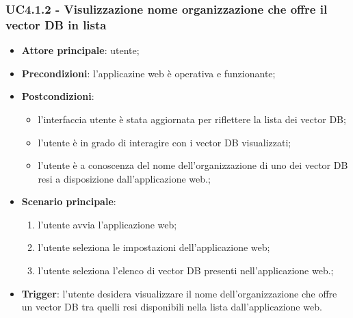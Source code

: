 \documentclass[10pt, a4paper]{article}
\begin{document}
    \subsubsection{UC4.1.2 - Visulizzazione nome organizzazione che offre il vector DB in lista}
    \begin{itemize}
        \item \textbf{Attore principale}: utente;
        \item \textbf{Precondizioni}: l'applicazine web è operativa e funzionante;
        \item \textbf{Postcondizioni}: 
        \begin{itemize}
            \item l'interfaccia utente è stata aggiornata per riflettere la lista dei vector DB;
            \item l'utente è in grado di interagire con i vector DB visualizzati;
            \item l'utente è a conoscenza del nome dell'organizzazione di uno dei vector DB resi a disposizione dall'applicazione web.;
        \end{itemize}
        \item \textbf{Scenario principale}:
            \begin{enumerate}
                \item l'utente avvia l'applicazione web;
                \item l'utente seleziona le impostazioni dell'applicazione web;
                \item l'utente seleziona l'elenco di vector DB presenti nell'applicazione web.;
            \end{enumerate}
        \item \textbf{Trigger}: l'utente desidera visualizzare il nome dell'organizzazione che offre un vector DB tra quelli resi disponibili nella lista dall'applicazione web.
    \end{itemize}
\end{document}
